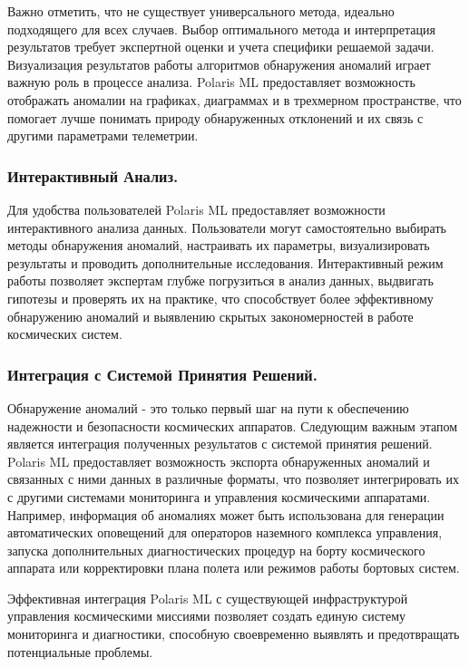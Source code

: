 \documentclass[14pt, a4paper]{extreport}
\begin{document}
    Важно отметить, что не существует универсального метода, идеально подходящего для всех случаев. Выбор оптимального метода и интерпретация результатов требует экспертной оценки и учета специфики решаемой задачи.
    Визуализация результатов работы алгоритмов обнаружения аномалий играет важную роль в процессе анализа. Polaris ML предоставляет возможность отображать аномалии на графиках, диаграммах и в трехмерном пространстве, что помогает лучше понимать природу обнаруженных отклонений и их связь с другими параметрами телеметрии.

    \subsubsection{Интерактивный Анализ.}

    Для удобства пользователей Polaris ML предоставляет возможности интерактивного анализа данных. Пользователи могут самостоятельно выбирать методы обнаружения аномалий, настраивать их параметры, визуализировать результаты и проводить дополнительные исследования.
    Интерактивный режим работы позволяет экспертам глубже погрузиться в анализ данных, выдвигать гипотезы и проверять их на практике, что способствует более эффективному обнаружению аномалий и выявлению скрытых закономерностей в работе космических систем.

    \subsubsection{Интеграция с Системой Принятия Решений.}

    Обнаружение аномалий - это только первый шаг на пути к обеспечению надежности и безопасности космических аппаратов.
    Следующим важным этапом является интеграция полученных результатов с системой принятия решений.
    Polaris ML предоставляет возможность экспорта обнаруженных аномалий и связанных с ними данных в различные форматы, что позволяет интегрировать их с другими системами мониторинга и управления космическими аппаратами.
    Например, информация об аномалиях может быть использована для генерации автоматических оповещений для операторов наземного комплекса управления,
    запуска дополнительных диагностических процедур на борту космического аппарата или корректировки плана полета или режимов работы бортовых систем.

    Эффективная интеграция Polaris ML с существующей инфраструктурой управления космическими миссиями позволяет создать единую систему мониторинга и диагностики, способную своевременно выявлять и предотвращать потенциальные проблемы.
\end{document}
